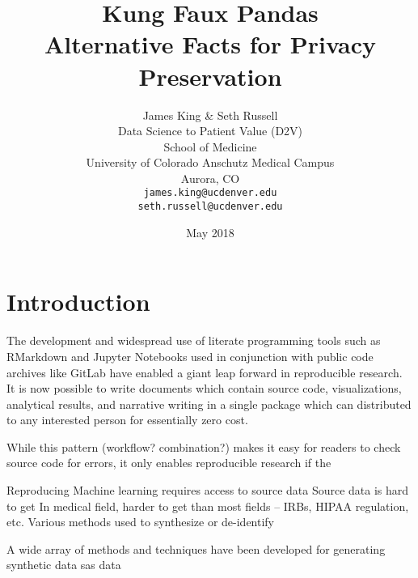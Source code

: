 \documentclass{article}
\title{%
  Kung Faux Pandas \\
  \large Alternative Facts for 
    Privacy Preservation}
\author{
  James King \& Seth Russell\\
  Data Science to Patient Value (D2V)\\
  School of Medicine \\
  University of Colorado Anschutz Medical Campus\\
  Aurora, CO\\
  \texttt{james.king@ucdenver.edu} \\ 
  \texttt{seth.russell@ucdenver.edu} \\
  }
\date{May 2018}
\begin{document}


\maketitle

\begin{abstract}

\end{abstract}

\section{Introduction}

The development and widespread use of literate programming tools such as RMarkdown and Jupyter Notebooks used in conjunction with public code archives like GitLab have enabled a giant leap forward in reproducible research.  It is now possible to write documents which contain source code, visualizations, analytical results, and narrative writing in a single package which can distributed to any interested person for essentially zero cost.

While this pattern (workflow? combination?) makes it easy for readers to check source code for errors, it only enables reproducible research if the 

Reproducing Machine learning requires access to source data
Source data is hard to get
In medical field, harder to get than most fields – IRBs, HIPAA regulation, etc.
Various methods used to synthesize or de-identify

A wide array of methods and techniques have been developed for generating synthetic data sas  data \cite{walonoski_synthea:_2018}




\end{document}
